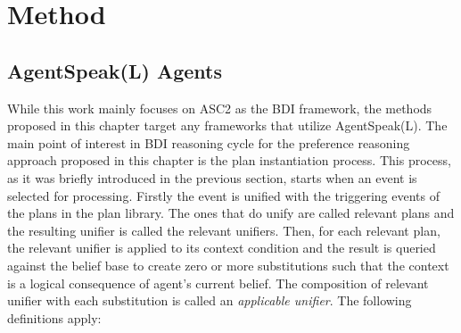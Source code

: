 

\section{Method}
 \label{sec:method}

\subsection{AgentSpeak(L) Agents}
\label{ssec:agentspeak}
While this work mainly focuses on ASC2 as the BDI framework, the methods proposed in this chapter target any frameworks that utilize AgentSpeak(L). The main point of interest in BDI reasoning cycle for the preference reasoning approach proposed in this chapter is the plan instantiation process. This process, as it was briefly introduced in the previous section, starts when an event is selected for processing. Firstly the event is unified with the triggering events of the plans in the plan library. The ones that do unify are called relevant plans and the resulting unifier is called the relevant unifiers. Then, for each relevant plan, the relevant unifier is applied to its context condition and the result is queried against the belief base to create zero or more substitutions such that the context is a logical consequence of agent's current belief. The composition of relevant unifier with each substitution is called an \textit{applicable unifier}.  The following definitions apply:



